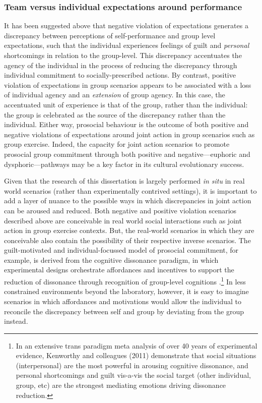 \subsubsection{Team versus individual expectations around performance}
It has been suggested above that negative violation of expectations generates a discrepancy between perceptions of self-performance and group level expectations, such that the individual experiences feelings of guilt and \textit{personal} shortcomings in relation to the group-level.   This discrepancy accentuates the agency of the individual in the process of reducing the discrepancy through individual commitment to socially-prescribed actions.  By contrast, positive violation of expectations in group scenarios appears to be associated with a loss of individual agency and an \textit{extension} of group agency.  In this case, the accentuated unit of experience is that of the group, rather than the individual: the group is celebrated as the source of the discrepancy rather than the individual.  Either way, prosocial behaviour is the outcome of both positive and negative violations of expectations around joint action in group scenarios such as group exercise.  Indeed, the capacity for joint action scenarios to promote prosocial group commitment through both positive and negative---euphoric and dysphoric---pathways may be a key factor in its cultural evolutionary success.

Given that the research of this dissertation is largely performed \textit{in situ} in real world scenarios (rather than experimentally contrived settings), it is important to add a layer of nuance to the possible ways in which discrepancies in joint action can be aroused and reduced.  Both negative and positive violation scenarios described above are conceivable in real world social interactions such as joint action in group exercise contexts. But, the real-world scenarios in which they are conceivable also contain the possibility of their respective inverse scenarios.  The guilt-motivated and individual-focussed model of prosocial commitment, for example, is derived from the cognitive dissonance paradigm, in which experimental designs orchestrate affordances and incentives to support the reduction of dissonance through recognition of group-level cognitions \citep{Kenworthy2011}.\footnote{In an extensive trans paradigm meta analysis of over 40 years of experimental evidence, Kenworthy and colleagues (2011) demonstrate that social situations (interpersonal) are the most powerful in arousing cognitive dissonance, and personal shortcomings and guilt vis-a-vis the social target (other individual, group, etc) are the strongest mediating emotions driving dissonance reduction.}  In less constrained environments beyond the laboratory, however, it is easy to imagine scenarios in which affordances and motivations would allow the individual to reconcile the discrepancy between self and group by deviating from the group instead.

